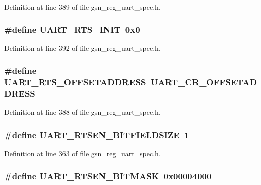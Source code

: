 Definition at line 389 of file gsn\_\-reg\_\-uart\_\-spec.h.

\hypertarget{a00575_a8248829b470361ce66b3e170eb4ee318}{
\subsubsection[{UART\_\-RTS\_\-INIT}]{\setlength{\rightskip}{0pt plus 5cm}\#define UART\_\-RTS\_\-INIT~0x0}}
\label{a00575_a8248829b470361ce66b3e170eb4ee318}


Definition at line 392 of file gsn\_\-reg\_\-uart\_\-spec.h.

\hypertarget{a00575_a1250d0ed765eac5da96a5c0a8886ba4d}{
\subsubsection[{UART\_\-RTS\_\-OFFSETADDRESS}]{\setlength{\rightskip}{0pt plus 5cm}\#define UART\_\-RTS\_\-OFFSETADDRESS~UART\_\-CR\_\-OFFSETADDRESS}}
\label{a00575_a1250d0ed765eac5da96a5c0a8886ba4d}


Definition at line 388 of file gsn\_\-reg\_\-uart\_\-spec.h.

\hypertarget{a00575_aa49a75bb62cd602501745674998578cc}{
\subsubsection[{UART\_\-RTSEN\_\-BITFIELDSIZE}]{\setlength{\rightskip}{0pt plus 5cm}\#define UART\_\-RTSEN\_\-BITFIELDSIZE~1}}
\label{a00575_aa49a75bb62cd602501745674998578cc}


Definition at line 363 of file gsn\_\-reg\_\-uart\_\-spec.h.

\hypertarget{a00575_a7b53f7e3e6414fa325ad827a78b679c2}{
\subsubsection[{UART\_\-RTSEN\_\-BITMASK}]{\setlength{\rightskip}{0pt plus 5cm}\#define UART\_\-RTSEN\_\-BITMASK~0x00004000}}
\label{a00575_a7b53f7e3e6414fa325ad827a78b679c2}


